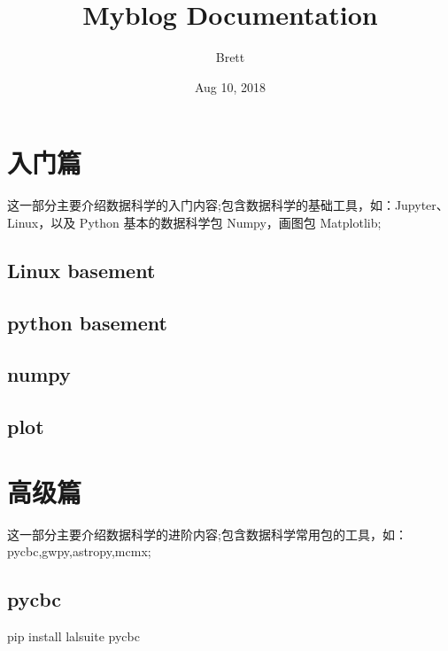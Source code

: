 \documentclass[letterpaper,10pt,english]{sphinxmanual}
\title{Myblog Documentation}
\date{Aug 10, 2018}
\author{Brett}
\begin{document}
\maketitle
\sphinxtableofcontents
{}\label{\detokenize{index::doc}}



\chapter{入门篇}
\label{\detokenize{base/index:welcome-to-brettlv-s-blog}}\label{\detokenize{base/index::doc}}\label{\detokenize{base/index:id1}}
这一部分主要介绍数据科学的入门内容;包含数据科学的基础工具，如：Jupyter、Linux，以及 Python 基本的数据科学包 Numpy，画图包 Matplotlib;


\section{Linux basement}
\label{\detokenize{base/01_linux::doc}}\label{\detokenize{base/01_linux:linux-basement}}

\section{python basement}
\label{\detokenize{base/02_ipython:python-basement}}\label{\detokenize{base/02_ipython::doc}}

\section{numpy}
\label{\detokenize{base/03_numpy:numpy}}\label{\detokenize{base/03_numpy::doc}}

\section{plot}
\label{\detokenize{base/04_matplotlib:plot}}\label{\detokenize{base/04_matplotlib::doc}}

\chapter{高级篇}
\label{\detokenize{advanced/index::doc}}\label{\detokenize{advanced/index:id1}}
这一部分主要介绍数据科学的进阶内容;包含数据科学常用包的工具，如：
pycbc,gwpy,astropy,mcmx;


\section{pycbc}
\label{\detokenize{advanced/01_pycbc:pycbc}}\label{\detokenize{advanced/01_pycbc::doc}}
pip install lalsuite pycbc
\end{document}
